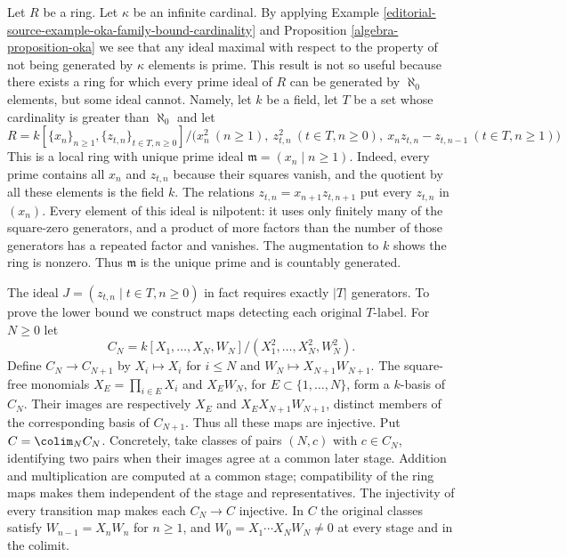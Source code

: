 \begin{remark}
\label{editorial-source-remark-cohen-bound-cardinality}
Let $R$ be a ring. Let $\kappa$ be an infinite cardinal.
By applying
Example \ref{editorial-source-example-oka-family-bound-cardinality} and
Proposition \ref{algebra-proposition-oka}
we see that any ideal maximal with respect to the property of not being
generated by $\kappa$ elements is prime. This result is not so
useful because there exists a ring for which every prime ideal
of $R$ can be generated by $\aleph_0$ elements, but some
ideal cannot. Namely, let $k$ be a field, let $T$ be a set whose
cardinality is greater than $\aleph_0$ and let
$$
R = k[\{x_n\}_{n \geq 1}, \{z_{t, n}\}_{t \in T, n \geq 0}]/
\bigl(x_n^2\ (n\geq1),\ z_{t,n}^2\ (t\in T,n\geq0),\
x_nz_{t,n}-z_{t,n-1}\ (t\in T,n\geq1)\bigr)
$$
This is a local ring with unique prime ideal
$\mathfrak m=(x_n\mid n\geq1)$. Indeed, every prime contains all
$x_n$ and $z_{t,n}$ because their squares vanish, and the quotient
by all these elements is the field $k$. The relations
$z_{t,n}=x_{n+1}z_{t,n+1}$ put every $z_{t,n}$ in $(x_n)$.
Every element of this ideal is nilpotent: it uses only finitely many
of the square-zero generators, and a product of more factors than
the number of those generators has a repeated factor and vanishes.
The augmentation to $k$ shows the ring is nonzero.
Thus $\mathfrak m$ is the unique prime and is countably generated.

\medskip\noindent
The ideal $J=(z_{t,n}\mid t\in T,n\geq0)$ in fact requires exactly
$|T|$ generators. To prove the lower bound we construct maps detecting
each original $T$-label. For $N\geq0$ let
$$
C_N=k[X_1,\ldots,X_N,W_N]/(X_1^2,\ldots,X_N^2,W_N^2).
$$
Define $C_N\to C_{N+1}$ by $X_i\mapsto X_i$ for $i\leq N$
and $W_N\mapsto X_{N+1}W_{N+1}$.
The square-free monomials
$X_E=\prod_{i\in E}X_i$ and $X_EW_N$, for $E\subset\{1,\ldots,N\}$,
form a $k$-basis of $C_N$.
Their images are respectively $X_E$ and $X_EX_{N+1}W_{N+1}$,
distinct members of the corresponding basis of $C_{N+1}$.
Thus all these maps are injective. Put $C=\colim_N C_N$.
Concretely, take classes of pairs $(N,c)$ with $c\in C_N$, identifying
two pairs when their images agree at a common later stage. Addition
and multiplication are computed at a common stage; compatibility of
the ring maps makes them independent of the stage and representatives.
The injectivity of every transition map makes each $C_N\to C$ injective.
In $C$ the original classes satisfy
$W_{n-1}=X_nW_n$ for $n\geq1$, and
$W_0=X_1\cdots X_NW_N\ne0$ at every stage and in the colimit.


\end{remark}

